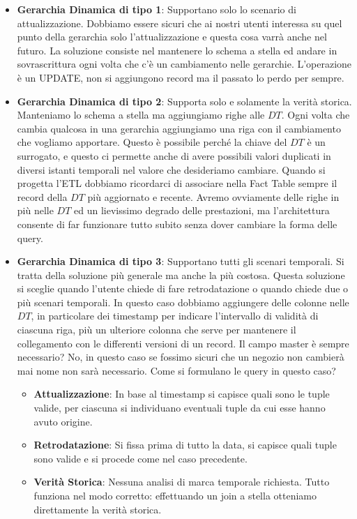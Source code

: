 \begin{itemize}
	\item \textbf{Gerarchia Dinamica di tipo 1}: Supportano solo lo scenario di attualizzazione. Dobbiamo essere sicuri che ai nostri utenti interessa su quel punto della gerarchia solo l'attualizzazione e questa cosa varrà anche nel futuro. La soluzione consiste nel mantenere lo schema a stella ed andare in sovrascrittura ogni volta che c'è un cambiamento nelle gerarchie. L'operazione è un UPDATE, non si aggiungono record ma il passato lo perdo per sempre.
	\item \textbf{Gerarchia Dinamica di tipo 2}: Supporta solo e solamente la verità storica. Manteniamo lo schema a stella ma aggiungiamo righe alle $DT$. Ogni volta che cambia qualcosa in una gerarchia aggiungiamo una riga con il cambiamento che vogliamo apportare. Questo è possibile perché la chiave del $DT$ è un surrogato, e questo ci permette anche di avere possibili valori duplicati in diversi istanti temporali nel valore che desideriamo cambiare.\newline
	Quando si progetta l'ETL dobbiamo ricordarci di associare nella Fact Table sempre il record della $DT$ più aggiornato e recente.\newline
	Avremo ovviamente delle righe in più nelle $DT$ ed un lievissimo degrado delle prestazioni, ma l'architettura consente di far funzionare tutto subito senza dover cambiare la forma delle query.
	\item \textbf{Gerarchia Dinamica di tipo 3}: Supportano tutti gli scenari temporali. Si tratta della soluzione più generale ma anche la più costosa. Questa soluzione si sceglie quando l'utente chiede di fare retrodatazione o quando chiede due o più scenari temporali.\newline
	In questo caso dobbiamo aggiungere delle colonne nelle $DT$, in particolare dei timestamp per indicare l'intervallo di validità di ciascuna riga, più un ulteriore colonna che serve per mantenere il collegamento con le differenti versioni di un record.\newline
	Il campo master è sempre necessario? No, in questo caso se fossimo sicuri che un negozio non cambierà mai nome non sarà necessario.
	Come si formulano le query in questo caso?
	\begin{itemize}
		\item \textbf{Attualizzazione}: In base al timestamp si capisce quali sono le tuple valide, per ciascuna si individuano eventuali tuple da cui esse hanno avuto origine.
		\item \textbf{Retrodatazione}: Si fissa prima di tutto la data, si capisce quali tuple sono valide e si procede come nel caso precedente.
		\item \textbf{Verità Storica}: Nessuna analisi di marca temporale richiesta. Tutto funziona nel modo corretto: effettuando un join a stella otteniamo direttamente la verità storica.
	\end{itemize}
\end{itemize}

